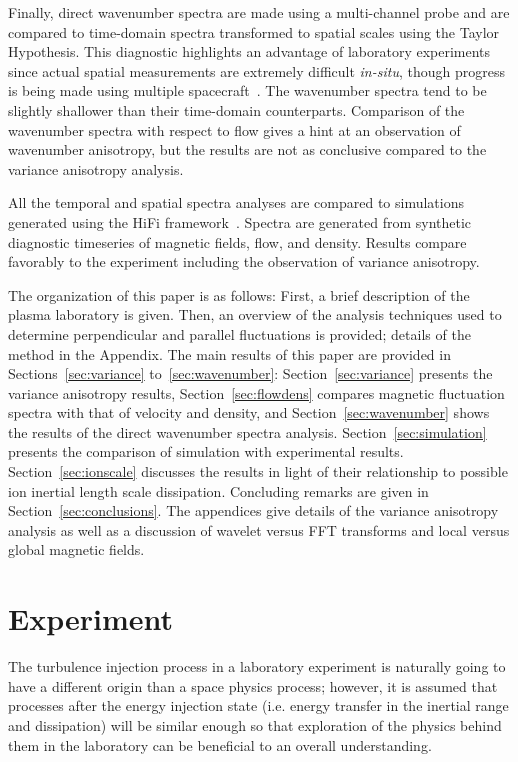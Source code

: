 \documentclass[manuscript]{aastex}
\begin{document}
Finally, direct wavenumber spectra are made using a multi-channel probe and are compared to time-domain spectra transformed to spatial scales using the Taylor Hypothesis. This diagnostic highlights an advantage of laboratory experiments since actual spatial measurements are extremely difficult {\it in-situ}, though progress is being made using multiple spacecraft~\citep{sah06,sah10}.  The wavenumber spectra tend to be slightly shallower than their time-domain counterparts. Comparison of the wavenumber spectra with respect to flow gives a hint at an observation of wavenumber anisotropy, but the results are not as conclusive compared to the variance anisotropy analysis.

All the temporal and spatial spectra analyses are compared to simulations generated using the HiFi framework~\citep{sch14a}. Spectra are generated from synthetic diagnostic timeseries of magnetic fields, flow, and density. Results compare favorably to the experiment including the observation of variance anisotropy.

The organization of this paper is as follows: First, a brief description of the plasma laboratory is given. Then, an overview of the analysis techniques used to determine perpendicular and parallel fluctuations is provided; details of the method in the Appendix. The main results of this paper are provided in Sections~\ref{sec:variance} to~\ref{sec:wavenumber}: Section~\ref{sec:variance} presents the variance anisotropy results, Section~\ref{sec:flowdens} compares magnetic fluctuation spectra with that of velocity and density, and Section~\ref{sec:wavenumber} shows the results of the direct wavenumber spectra analysis. Section~\ref{sec:simulation} presents the comparison of simulation with experimental results. Section~\ref{sec:ionscale} discusses the results in light of their relationship to possible ion inertial length scale dissipation. Concluding remarks are given in Section~\ref{sec:conclusions}. The appendices give details of the variance anisotropy analysis as well as a discussion of wavelet versus FFT transforms and local versus global magnetic fields.

\section{Experiment}\label{sec:experiment}

The turbulence injection process in a laboratory experiment is naturally going to have a different origin than a space physics process; however, it is assumed that processes after the energy injection state (i.e. energy transfer in the inertial range and dissipation) will be similar enough so that exploration of the physics behind them in the laboratory can be beneficial to an overall understanding.
\end{document}
